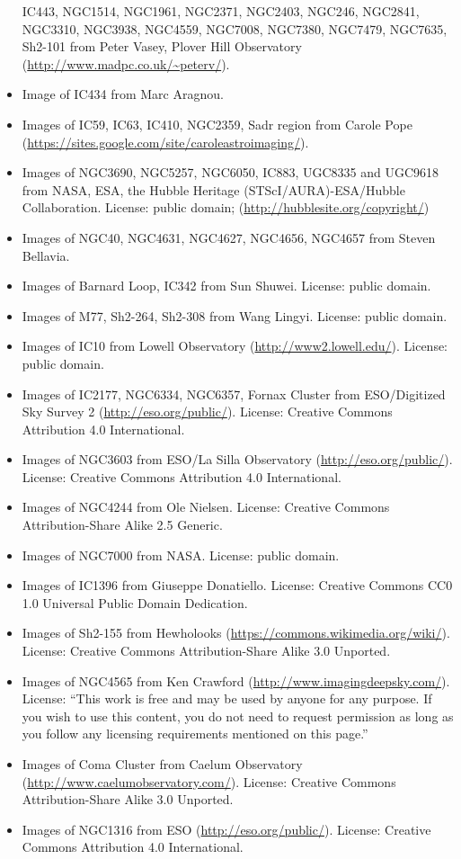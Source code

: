 \begin{itemize}
	  IC443, NGC1514, NGC1961, NGC2371, NGC2403, NGC246, NGC2841, NGC3310, NGC3938, NGC4559, NGC7008, NGC7380, NGC7479, NGC7635, Sh2-101
	  from Peter Vasey, Plover Hill Observatory (\url{http://www.madpc.co.uk/~peterv/}).
\item Image of IC434 from Marc Aragnou.
\item Images of IC59, IC63, IC410, NGC2359, Sadr region from Carole Pope (\url{https://sites.google.com/site/caroleastroimaging/}).
\item Images of NGC3690, NGC5257, NGC6050, IC883, UGC8335 and UGC9618 from NASA, ESA, the Hubble Heritage (STScI/AURA)-ESA/Hubble Collaboration.
	  License: public domain; (\url{http://hubblesite.org/copyright/})
\item Images of NGC40, NGC4631, NGC4627, NGC4656, NGC4657 from Steven Bellavia.
\item Images of Barnard Loop, IC342 from Sun Shuwei. License: public domain.
\item Images of M77, Sh2-264, Sh2-308 from Wang Lingyi. License: public domain.
\item Images of IC10 from Lowell Observatory (\url{http://www2.lowell.edu/}). License: public domain.
\item Images of IC2177, NGC6334, NGC6357, Fornax Cluster from ESO/Digitized Sky Survey 2 (\url{http://eso.org/public/}).
	  License: Creative Commons Attribution 4.0 International. 
\item Images of NGC3603 from ESO/La Silla Observatory (\url{http://eso.org/public/}). License: Creative Commons Attribution 4.0 International. 
\item Images of NGC4244 from Ole Nielsen. License: Creative Commons Attribution-Share Alike 2.5 Generic. 
\item Images of NGC7000 from NASA. License: public domain.
\item Images of IC1396 from Giuseppe Donatiello. License: Creative Commons CC0 1.0 Universal Public Domain Dedication.
\item Images of Sh2-155 from Hewholooks (\url{https://commons.wikimedia.org/wiki/}). License: Creative Commons Attribution-Share Alike 3.0 Unported.
\item Images of NGC4565 from Ken Crawford (\url{http://www.imagingdeepsky.com/}).
	  License: ``This work is free and may be used by anyone for any purpose.
	  If you wish to use this content, you do not need to request permission
	  as long as you follow any licensing requirements mentioned on this page.''
\item Images of Coma Cluster from Caelum Observatory (\url{http://www.caelumobservatory.com/}). License: Creative Commons Attribution-Share Alike 3.0 Unported.
\item Images of NGC1316 from ESO (\url{http://eso.org/public/}). License: Creative Commons Attribution 4.0 International.
\end{itemize}


